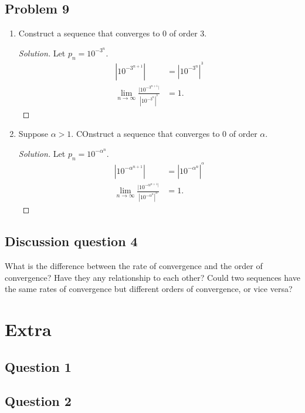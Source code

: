 \documentclass{article}
\begin{document}
\subsection*{Problem 9}
\begin{enumerate}[label=\alph*.]
    \item Construct a sequence that converges to 0 of order 3.
    \begin{proof}[Solution]
        Let $p_n = 10^{-3^n}$.
        \begin{align*}
            |10^{-3^{n+1}}| & = |10^{-3^n}|^{^3} \\
            \lim_{n\rightarrow\infty}\frac{|10^{-3^{n+1}|}}{|10^{-3^n}|^{^3}} & = 1.
        \end{align*}
    \end{proof}
    \item Suppose $\alpha > 1$. COnstruct a sequence that converges to 0 of order $\alpha$.
    \begin{proof}[Solution]
        Let $p_n = 10^{-\alpha^n}$.
        \begin{align*}
            |10^{-\alpha^{n+1}}| & = |10^{-\alpha^n}|^{^\alpha} \\
            \lim_{n\rightarrow\infty}\frac{|10^{-\alpha^{n+1}|}}{|10^{-\alpha^n}|^{^\alpha}} & = 1.
        \end{align*}
    \end{proof}
\end{enumerate}

\subsection*{Discussion question 4}
What is the difference between the rate of convergence and the order of convergence? Have they any 
relationship to each other? Could two sequences have the same rates of convergence but different 
orders of convergence, or vice versa?

\section*{Extra}
\subsection*{Question 1}
\subsection*{Question 2}
\end{document}
